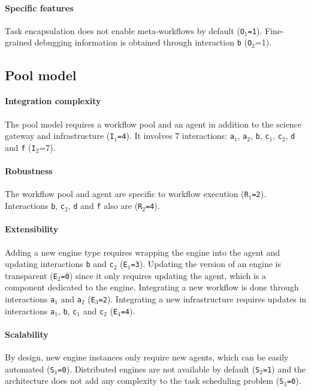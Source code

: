 \documentclass[preprint,3p,twocolumn]{elsarticle}
\newcommand{\correction}[1]{\color{blue}#1\color{black}\xspace}
\begin{document}
\paragraph{Specific features} Task encapsulation \correction{does not enable meta-workflows by default (\texttt{O$_1$=1})}. Fine-grained debugging
information is obtained through interaction \texttt{b}
(\texttt{O$_2$}=1). 

\subsection{Pool model}

\paragraph{Integration complexity} The pool model requires a workflow pool and an
agent in addition to the science gateway and infrastructure
(\texttt{I$_1$=4}). It involves 7 interactions: \texttt{a$_1$},
\texttt{a$_2$}, \texttt{b}, \texttt{c$_1$}, \texttt{c$_2$}, \texttt{d}
and \texttt{f} (\texttt{I$_2$}=7).

\paragraph{Robustness} The workflow pool and agent are specific to
workflow execution (\texttt{R$_1$=2}). Interactions \texttt{b},
\texttt{c$_2$}, \texttt{d} and \texttt{f} also are (\texttt{R$_2$=4}).

\paragraph{Extensibility} Adding a new engine type requires wrapping
the engine into the agent and updating interactions \texttt{b} and
\texttt{c$_2$} (\texttt{E$_1$=3}). Updating the version of an engine
is transparent (\texttt{E$_2$=0}) since it only requires updating the
agent, which is a component dedicated to the engine. Integrating a new workflow is
done through interactions \texttt{a$_1$} and \texttt{a$_2$}
(\texttt{E$_3$=2}). Integrating a new infrastructure requires updates
in interactions \texttt{a$_1$}, \texttt{b}, \texttt{c$_1$} and \texttt{c$_2$}
(\texttt{E$_4$=4}).

\paragraph{Scalability} By design, new engine instances only require
new agents, which can be easily automated (\texttt{S$_1$=0}). Distributed engines are not available
by default (\texttt{S$_2$=1}) and the architecture does not add any
complexity to the task scheduling problem (\texttt{S$_3$=0}).
\end{document}
